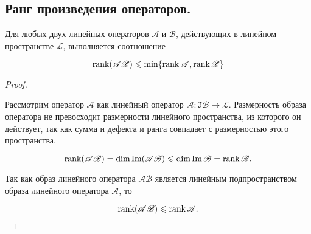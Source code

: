 \subsection{
    Ранг произведения операторов.
}

Для любых двух линейных операторов $\mathscr{A}$ и $\mathscr{B}$, действующих в линейном пространстве $\mathcal{L}$, выполняется соотношение

$$\operatorname{\mathop{\mathrm{rank}}}(\mathscr{A}\mathscr{B}) \leqslant \min\{\operatorname{\mathop{\mathrm{rank}}}\mathscr{A}, \operatorname{\mathop{\mathrm{rank}}}\mathscr{B}\}$$

\begin{proof}~

    Рассмотрим оператор $\mathscr{A}$ как линейный оператор $\mathscr{A}\colon \Im\mathscr{B} \to \mathcal{L}$. Размерность образа оператора не превосходит размерности линейного пространства, из которого он действует, так как сумма и дефекта и ранга совпадает с размерностью этого пространства.

    $$\operatorname{\mathop{\mathrm{rank}}}(\mathscr{A}\mathscr{B}) = \dim \operatorname{\mathop{\mathrm{Im}}} (\mathscr{A}\mathscr{B}) \leqslant \dim \operatorname{\mathop{\mathrm{Im}}} \mathscr{B} = \operatorname{\mathop{\mathrm{rank}}} \mathscr{B}.$$
    
    Так как образ линейного оператора $\mathscr{A}\mathscr{B}$ является линейным подпространством образа линейного оператора $\mathscr{A}$, то
    
    $$\operatorname{\mathop{\mathrm{rank}}}(\mathscr{A}\mathscr{B}) \leqslant \operatorname{\mathop{\mathrm{rank}}} \mathscr{A}.$$
\end{proof}


\begin{comment}~

    Доказанное соотношение можно перенести на квадратные матрицы. 
    
    Получаем, 
    $$\rank{(AB)} \leq \min\{\rank A, \rank B\}.$$

    Пусть $B$ - невырожденная. То есть ее ранг равен размерности матрицы. 
    
    Тогда $\rank{(AB)} \leq \rank A$ и одновременно $\rank A = \rank ((AB)B^{-1}) \leq \rank (AB)$.

    То есть 
    
    $$\rank (AB) \leq \rank A \leq \rank (AB).$$
    
    Следовательно, при умножении матрицы $A$ справа на невырожденную матрицу ее ранг не изменяется. 
    
    При умножении матрицы $A$ слева на невырожденную матрицу ранг также не изменяется, что доказывается аналогично.
    \label{comment:comment_24_2}
\end{comment}
